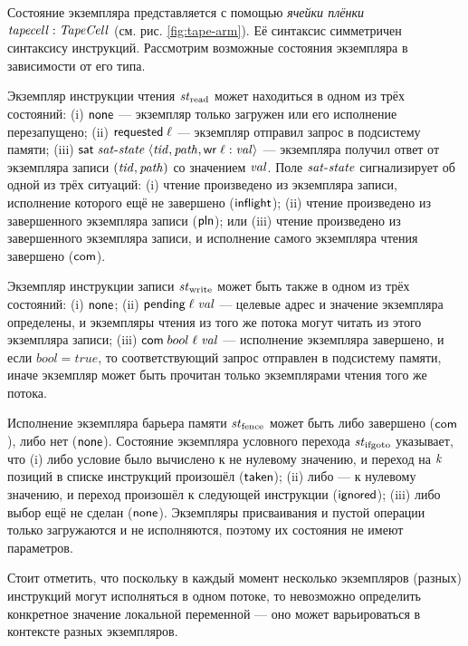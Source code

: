 Состояние экземпляра представляется с помощью \emph{ячейки плёнки} $\mathit{tapecell}: \mathit{TapeCell}$ (см. рис. \ref{fig:tape-arm}).
Её синтаксис симметричен синтаксису инструкций. Рассмотрим возможные состояния экземпляра в зависимости от его типа.

Экземпляр инструкции чтения $\mathit{st}_{\textup{\rm read}}$ может находиться в одном из трёх состояний:
(i)   $\mathsf{none}$ --- экземпляр только загружен или его исполнение перезапущено;
(ii)  $\mathsf{requested} \; \ell$ --- экземпляр отправил запрос в подсистему памяти;
(iii) $\mathsf{sat} \; \mathit{sat\text{-}state} \; \langle \mathit{tid},  \mathit{path}, {\sf wr} \;  \ell:\mathit{val} \rangle$ ---
      экземпляра получил ответ от экземпляра записи $(\mathit{tid}, \mathit{path})$ со значением $\mathit{val}$.
      Поле $\mathit{sat\text{-}state}$ сигнализирует об одной из трёх ситуаций:
      (i) чтение произведено из экземпляра записи, исполнение которого ещё не завершено
      ($\mathsf{inflight}$);
      (ii) чтение произведено из завершенного экземпляра записи ($\mathsf{pln}$); или
      (iii) чтение произведено из завершенного экземпляра записи, и исполнение самого
      экземпляра чтения завершено ($\mathsf{com}$).

Экземпляр инструкции записи $\mathit{st}_{\textup{\rm write}}$ может быть также в одном из трёх состояний:
(i)   $\mathsf{none}$;
(ii)  $\textsf{pending} \; \ell \; \mathit{val}$ --- целевые адрес и значение экземпляра определены,
и экземпляры чтения из того же потока могут читать из этого экземпляра записи;
(iii) $\mathsf{com} \; bool \; \ell \; \mathit{val}$ --- исполнение экземпляра завершено,
и если $bool = true$, то соответствующий запрос отправлен в подсистему памяти,
иначе экземпляр может быть прочитан только экземплярами чтения того же потока.

Исполнение экземпляра барьера памяти $\mathit{st}_{\textup{\rm fence}}$ может быть либо завершено 
($\mathsf{com}$), либо нет ($\mathsf{none}$).
Состояние экземпляра условного перехода $\mathit{st}_{\textup{\rm ifgoto}}$ указывает, что
(i) либо условие было вычислено к не нулевому значению, и переход на $\mathit{k}$ позиций в 
списке инструкций произошёл ($\mathsf{taken}$); (ii) либо --- к нулевому значению, и переход произошёл
к следующей инструкции ($\mathsf{ignored}$); (iii) либо выбор ещё не сделан ($\mathsf{none}$).
Экземпляры присваивания и пустой операции только загружаются и не исполняются, поэтому
их состояния не имеют параметров.

Стоит отметить, что поскольку в каждый момент несколько экземпляров
(разных) инструкций могут исполняться в одном потоке, то невозможно определить
конкретное значение локальной переменной --- оно может варьироваться в
контексте разных экземпляров.

